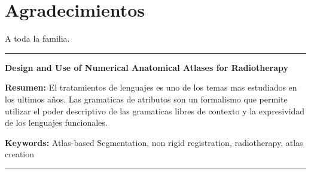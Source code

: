 \documentclass[a4paper,11pt,twoside]{ThesisStyle}
\begin{document}


\dominitoc


 \cleardoublepage

\section*{Agradecimientos}

 A toda la familia.

\tableofcontents

\mainmatter

% 
\appendix







\cleardoublepage
\begin{vcenterpage}
\noindent\rule[2pt]{\textwidth}{0.5pt}
\begin{center}
{\large\textbf{Design and Use of Numerical Anatomical Atlases for Radiotherapy\\}}
\end{center}
{\large\textbf{Resumen:}}
El tratamientos de lenguajes es uno de los temas mas estudiados en los ultimos años.
Las gramaticas de atributos son un formalismo que permite utilizar el poder descriptivo de las gramaticas libres de contexto y la expresividad de los lenguajes funcionales. 

{\large\textbf{Keywords:}}
Atlas-based Segmentation, non rigid registration, radiotherapy, atlas creation
\\
\noindent\rule[2pt]{\textwidth}{0.5pt}
\end{vcenterpage}
\end{document}
